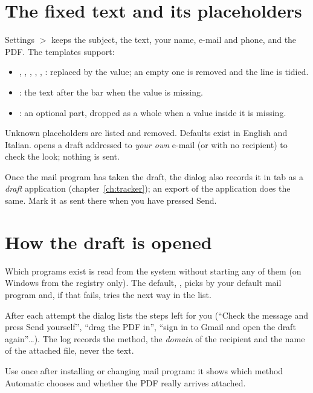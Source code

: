\section{The fixed text and its placeholders}
Settings $>$  keeps the subject, the text, your name, e-mail and phone, and the
PDF. The templates support:
\begin{itemize}
  \item {}, , , ,
        , : replaced by the value; an empty one is
        removed and the line is tidied.
  \item {}: the text after the bar when the value is
        missing.
  \item {}: an optional part, dropped as a whole when a
        value inside it is missing.
\end{itemize}
Unknown placeholders are listed and removed. Defaults exist in English and Italian.
 opens a draft addressed to \emph{your own} e-mail (or with no recipient)
to check the look; nothing is sent.

Once the mail program has taken the draft, the dialog also records it in tab  as a
\emph{draft} application (chapter~\ref{ch:tracker}); an export of the application does the same. Mark it as sent
there when you have pressed Send.

\section{How the draft is opened}
Which programs exist is read from the system without starting any of them (on Windows
from the registry only). The default, , picks by your default mail
program and, if that fails, tries the next way in the list.

After each attempt the dialog lists the steps left for you (``Check the message and press
Send yourself'', ``drag the PDF in'', ``sign in to Gmail and open the draft again''\ldots).
The log records the method, the \emph{domain} of the recipient and the name of the
attached file, never the text.

\begin{okbox}
Use  once after installing or changing mail program: it shows which method
Automatic chooses and whether the PDF really arrives attached.
\end{okbox}

